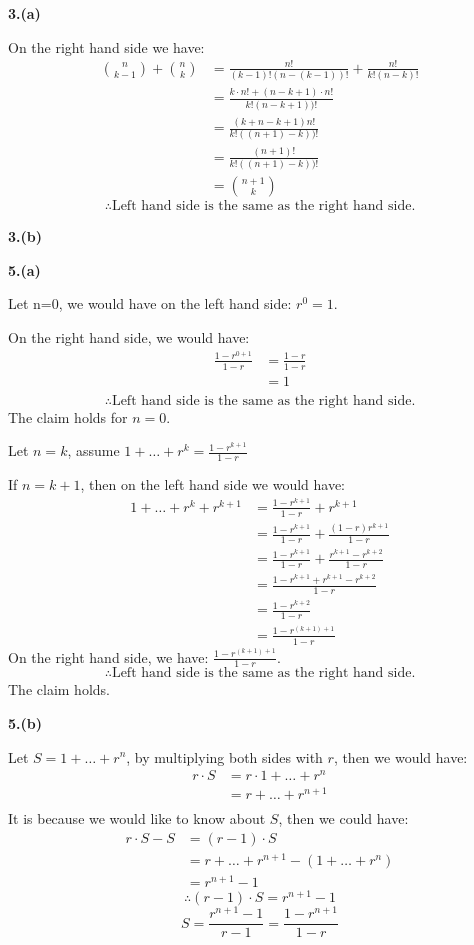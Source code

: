 \documentclass[a4paper,12pt]{report}
\begin{document}
\noindent
\textbf{3.(a)}

\noindent
On the right hand side we have:
\begin{align*}
\binom n{k-1}+\binom nk
&=\frac{n!}{(k-1)!(n-(k-1))!}+\frac{n!}{k!(n-k)!}\\
&=\frac{k\cdot{n!}+(n-k+1)\cdot{n!}}{k!(n-k+1))!}\\
&=\frac{(k+n-k+1)n!}{k!((n+1)-k))!}\\
&=\frac{(n+1)!}{k!((n+1)-k))!}\\
&=\binom {n+1}{k}
\end{align*}
\[\therefore \text{Left hand side is the same as the right hand side.}\]

\noindent
\textbf{3.(b)}


\noindent
\textbf{5.(a)}

\noindent
Let n=0, we would have on the left hand side: $r^0=1$.

\noindent
On the right hand side, we would have:
\begin{align*}
\frac{1-r^{0+1}}{1-r}
&=\frac{1-r}{1-r}\\
&=1\\
\end{align*}
\[\therefore \text{Left hand side is the same as the right hand side.}\]
The claim holds for $n=0$.

\noindent
Let $n=k$, assume $1+\dots+r^k=\frac{1-r^{k+1}}{1-r}$

\noindent
If $n=k+1$, then on the left hand side we would have:
\begin{align*}
1+\dots+r^k+r^{k+1}
&=\frac{1-r^{k+1}}{1-r}+r^{k+1}\\
&=\frac{1-r^{k+1}}{1-r}+\frac{(1-r)r^{k+1}}{1-r}\\
&=\frac{1-r^{k+1}}{1-r}+\frac{r^{k+1}-r^{k+2}}{1-r}\\
&=\frac{1-r^{k+1}+r^{k+1}-r^{k+2}}{1-r}\\
&=\frac{1-r^{k+2}}{1-r}\\
&=\frac{1-r^{(k+1)+1}}{1-r}
\end{align*}
On the right hand side, we have:
$\frac{1-r^{(k+1)+1}}{1-r}$.
\[\therefore \text{Left hand side is the same as the right hand side.}\]
The claim holds.

\noindent
\textbf{5.(b)}

\noindent
Let $S=1+\dots+r^n$, by multiplying both sides with $r$, then we would have:
\begin{align*}
r\cdot{S}
&=r\cdot{1+\dots+r^n}\\
&=r+\dots+r^{n+1}\\
\end{align*}
It is because we would like to know about $S$, then we could have:
\begin{align*}
r\cdot{S}-S
&=(r-1)\cdot{S}\\
&=r+\dots+r^{n+1}-(1+\dots+r^n)\\
&=r^{n+1}-1
\end{align*}
\[\therefore(r-1)\cdot{S}=r^{n+1}-1\]
\[S=\frac{r^{n+1}-1}{r-1}=\frac{1-r^{n+1}}{1-r}\]
\end{document}
